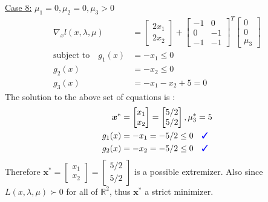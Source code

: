 \documentclass[a4paper,11pt]{article}
\newcommand{\V}[1]{\boldsymbol{#1}}
\newcommand{\mat}[1]{\begin{bmatrix}#1\end{bmatrix}}
\newcommand{\cmark}{{\color{blue}\text{\ding{51}}}}%
\begin{document}
\noindent\underline{Case 8:} $\mu_1=0, \mu_2=0, \mu_3>0$
\begin{align*}
 \nabla_x l(x,\lambda,\mu) &= \mat{2x_1\\ 2x_2} +
\mat{-1& 0\\ 0& -1\\-1& -1}^T\mat{0\\ 0\\ \mu_3}\\
% 
 \text{subject to}\quad g_1(x)&=-x_1 \leq 0\\
 g_2(x)&=-x_2 \leq 0\\
 g_3(x)&= -x_1 -x_2 +5 =0 
\end{align*}
The solution to the above set of equations is :
\begin{align*}
 \V{x}^*&=\mat{x_1\\x_2} = \mat{5/2\\5/2},  \mu_3^*= 5\\
 g_1(x)&=-x_1 =-5/2\leq 0 \quad \cmark\\
 g_2(x)&=-x_2 =-5/2\leq 0 \quad \cmark
\end{align*}
Therefore $\V{x}^*=\mat{x_1\\x_2} = \mat{5/2\\5/2}$ is a possible extremizer. Also since $L(x,\lambda,\mu)\succ0$ for all of $\mathbb{R}^2$, thus $\V{x}^*$ a strict minimizer.

\clearpage
\end{document}
